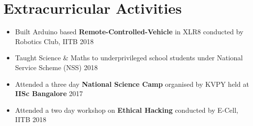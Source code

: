 
\section{Extracurricular Activities}







\begin{itemize}[itemsep = -0.75 mm, leftmargin=*]
\item Built Arduino based \textbf{Remote-Controlled-Vehicle} in XLR8 conducted by Robotics Club, IITB \hfill{2018}
\item Taught Science \& Maths to underprivileged school students under National Service Scheme (NSS)  \hfill{2018}
\item Attended a three day \textbf{National Science Camp} organised by KVPY held at \textbf{IISc Bangalore} \hfill{2017}
\item Attended a two day workshop on \textbf{Ethical Hacking} conducted by E-Cell, IITB \hfill{2018}
\end{itemize}